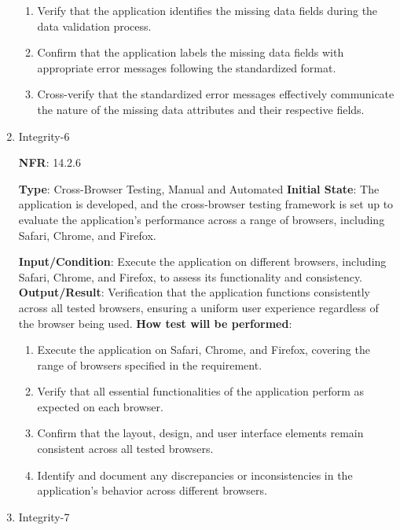 \documentclass[12pt, titlepage]{article}
\begin{document}
\begin{enumerate}
\begin{enumerate}
    \item Verify that the application identifies the missing data fields during the data validation process.



    \item Confirm that the application labels the missing data fields with appropriate error messages following the standardized format.



    \item Cross-verify that the standardized error messages effectively communicate the nature of the missing data attributes and their respective fields.

\end{enumerate}



\item {Integrity-6\\}

\textbf{NFR}: 14.2.6

\textbf{Type}: Cross-Browser Testing, Manual and Automated
\textbf{Initial State}: The application is developed, and the cross-browser testing framework is set up to evaluate the application's performance across a range of browsers, including Safari, Chrome, and Firefox.

\textbf{Input/Condition}: Execute the application on different browsers, including Safari, Chrome, and Firefox, to assess its functionality and consistency.
\textbf{Output/Result}: Verification that the application functions consistently across all tested browsers, ensuring a uniform user experience regardless of the browser being used.
\textbf{How test will be performed}: 
\begin{enumerate}
    \item Execute the application on Safari, Chrome, and Firefox, covering the range of browsers specified in the requirement.
    \item Verify that all essential functionalities of the application perform as expected on each browser.
    \item Confirm that the layout, design, and user interface elements remain consistent across all tested browsers.
    \item Identify and document any discrepancies or inconsistencies in the application's behavior across different browsers.

\end{enumerate}


\item {Integrity-7\\}


\end{enumerate}
\end{document}

